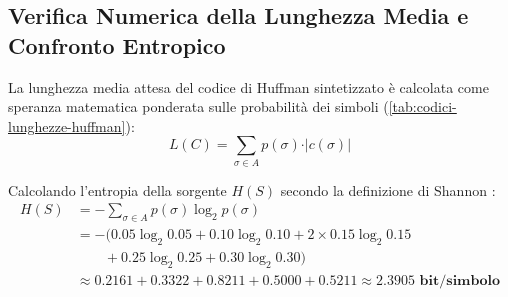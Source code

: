 \subsection{Verifica Numerica della Lunghezza Media e Confronto Entropico}
\label{subsec:calcolo-lunghezza-media}

La lunghezza media attesa del codice di Huffman sintetizzato \`e calcolata come speranza matematica ponderata sulle probabilit\`a dei simboli (\autoref{tab:codici-lunghezze-huffman}):
\begin{equation}
  L(C) = \sum_{\sigma \in A} p(\sigma) \cdot \vert c(\sigma) \vert
\end{equation}

\begin{table}[H]
\centering
\small
\caption{Quadro sinottico delle parole di codice, lunghezze e contributi alla lunghezza media attesa.}
\label{tab:codici-lunghezze-huffman}
\end{table}

Calcolando l'entropia della sorgente $H(S)$ secondo la definizione di Shannon \cite{shannon1948}:
\begin{align}
  H(S) &= -\sum_{\sigma \in A} p(\sigma) \log_2 p(\sigma) \nonumber \\
  &= - \Big( 0.05 \log_2 0.05 + 0.10 \log_2 0.10 + 2 \times 0.15 \log_2 0.15 \nonumber \\
  &\qquad + 0.25 \log_2 0.25 + 0.30 \log_2 0.30 \Big) \nonumber \\
  &\approx 0.2161 + 0.3322 + 0.8211 + 0.5000 + 0.5211 \approx \mathbf{2.3905\text{ bit/simbolo}}
\end{align}

